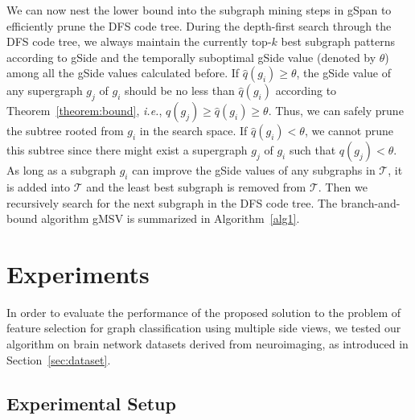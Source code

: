 \documentclass[conference]{IEEEtran}
\newcommand{\gscore}[0]{gSide}
\newcommand{\galgo}[0]{gMSV}
\begin{document}
We can now nest the lower bound into the subgraph mining steps in gSpan to efficiently prune the DFS code tree. During the depth-first search through the DFS code tree, we always maintain the currently top-$k$ best subgraph patterns according to {\gscore} and the temporally suboptimal {\gscore} value (denoted by $\theta$) among all the {\gscore} values calculated before. If $\hat{q}(g_i)\ge\theta$, the {\gscore} value of any supergraph $g_j$ of $g_i$ should be no less than $\hat{q}(g_i)$ according to Theorem~\ref{theorem:bound}, \emph{i.e.}, $q(g_j)\ge\hat{q}(g_i)\ge\theta$. Thus, we can safely prune the subtree rooted from $g_i$ in the search space. If $\hat{q}(g_i)<\theta$, we cannot prune this subtree since there might exist a supergraph $g_j$ of $g_i$ such that $q(g_j)<\theta$. As long as a subgraph $g_i$ can improve the {\gscore} values of any subgraphs in $\mathcal{T}$, it is added into $\mathcal{T}$ and the least best subgraph is removed from $\mathcal{T}$. Then we recursively search for the next subgraph in the DFS code tree. The branch-and-bound algorithm {\galgo} is summarized in Algorithm~\ref{alg1}.


\section{Experiments}\label{sec:exp}

In order to evaluate the performance of the proposed solution to the problem of feature selection for graph classification using multiple side views, we tested our algorithm on brain network datasets derived from neuroimaging, as introduced in Section~\ref{sec:dataset}.

\subsection{Experimental Setup}
\end{document}
